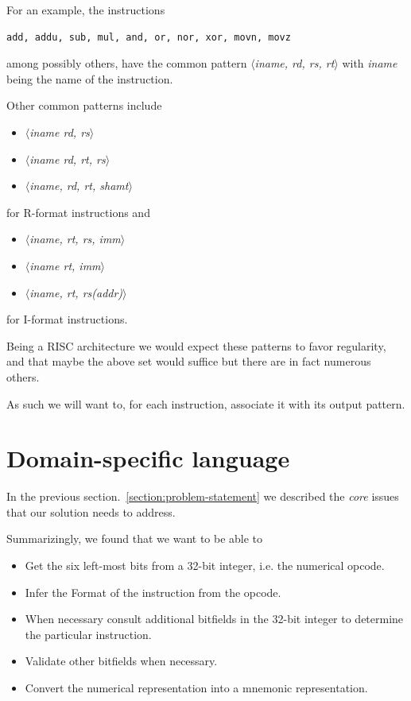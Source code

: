 \documentclass[a4paper]{article}
\begin{document}
For an example, the instructions

\begin{verbatim}
add, addu, sub, mul, and, or, nor, xor, movn, movz
\end{verbatim}

\newcommand{\pattern}[1]{\emph{$\langle$#1$\rangle$}}
among possibly others, have the common pattern \pattern{iname, rd, rs,
rt} with \emph{iname} being the name of the instruction.

Other common patterns include 

\begin{itemize}
\item \pattern{iname rd, rs}
\item \pattern{iname rd, rt, rs}
\item \pattern{iname, rd, rt, shamt}
\end{itemize}

for R-format instructions and

\begin{itemize}
\item \pattern{iname, rt, rs, imm}
\item \pattern{iname rt, imm}
\item \pattern{iname, rt, rs(addr)}
\end{itemize}

for I-format instructions.

Being a RISC architecture we would expect these patterns to favor
regularity, and that maybe the above set would suffice but there
are in fact numerous others.

As such we will want to, for each instruction, associate it with its
output pattern.
\section{Domain-specific language}

In the previous section.~\ref{section:problem-statement} we described
the \emph{core} issues that our solution needs to address. 

Summarizingly, we found that we want to be able to

\begin{itemize}
\item Get the six left-most bits from a 32-bit integer,
  i.e. the numerical opcode.
\item Infer the Format of the instruction from the opcode.
\item When necessary consult additional bitfields in the 32-bit integer to
      determine the particular instruction.
\item Validate other bitfields when necessary.
\item Convert the numerical representation into a mnemonic representation.
\end{itemize}
\end{document}
